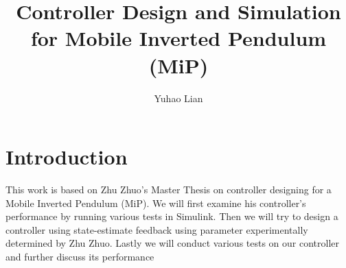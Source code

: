 \documentclass{article}
\title{Controller Design and Simulation for Mobile Inverted Pendulum (MiP)}
\author{Yuhao Lian}
\begin{document}
\maketitle
\section{Introduction}
This work is based on Zhu Zhuo's Master Thesis on controller designing for a Mobile Inverted Pendulum (MiP). We will first examine his controller's performance by running various tests in Simulink. Then we will try to design a controller using state-estimate feedback using parameter experimentally determined by Zhu Zhuo. Lastly we will conduct various tests on our controller and further discuss its performance
\end{document}
